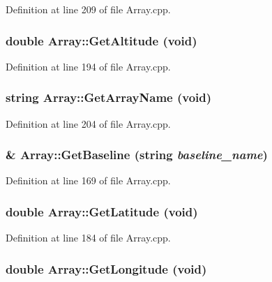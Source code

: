 Definition at line 209 of file Array.cpp.

\hypertarget{classArray_af8085a1990cb03ec60310289758a7ad0}{
\subsubsection[{GetAltitude}]{\setlength{\rightskip}{0pt plus 5cm}double Array::GetAltitude (void)}}
\label{classArray_af8085a1990cb03ec60310289758a7ad0}


Definition at line 194 of file Array.cpp.

\hypertarget{classArray_ad881590afefd938b89b5d078d43c2548}{
\subsubsection[{GetArrayName}]{\setlength{\rightskip}{0pt plus 5cm}string Array::GetArrayName (void)}}
\label{classArray_ad881590afefd938b89b5d078d43c2548}


Definition at line 204 of file Array.cpp.

\hypertarget{classArray_adc65140f06b85ad9a570c4d4a80ac78c}{
\subsubsection[{GetBaseline}]{ \& Array::GetBaseline (string {\em baseline\_\-name})}}
\label{classArray_adc65140f06b85ad9a570c4d4a80ac78c}


Definition at line 169 of file Array.cpp.

\hypertarget{classArray_ab6dbcc092c509568a17875bcd9f89f2e}{
\subsubsection[{GetLatitude}]{\setlength{\rightskip}{0pt plus 5cm}double Array::GetLatitude (void)}}
\label{classArray_ab6dbcc092c509568a17875bcd9f89f2e}


Definition at line 184 of file Array.cpp.

\hypertarget{classArray_ab3b8cb71d4721b6f5e50a1678eab0d98}{
\subsubsection[{GetLongitude}]{\setlength{\rightskip}{0pt plus 5cm}double Array::GetLongitude (void)}}
\label{classArray_ab3b8cb71d4721b6f5e50a1678eab0d98}


